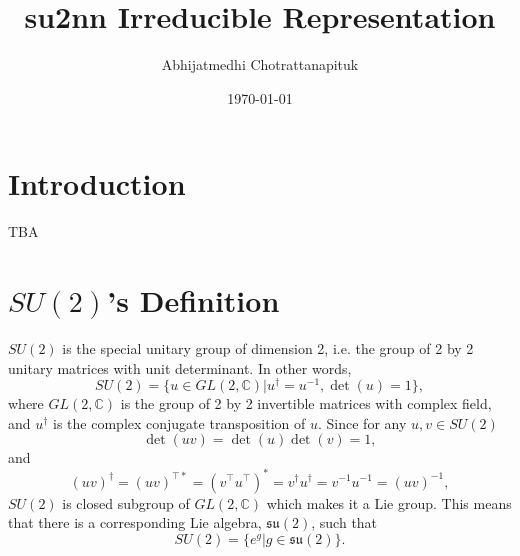 \documentclass[12pt]{revtex4-2}
\begin{document}
\title{su2nn Irreducible Representation}
\author{Abhijatmedhi Chotrattanapituk}

\date{\today}
\maketitle

\section{Introduction}
TBA

\section{$SU(2)$'s Definition}
$SU(2)$ is the special unitary group of dimension 2, i.e. the group of 2 by 2 unitary matrices 
with unit determinant. In other words,
\begin{equation}
    SU(2) = \{u \in GL(2, \mathbb{C})|u^\dagger=u^{-1}, \det(u) = 1\},
\end{equation}    
where $GL(2,\mathbb{C})$ is the group of 2 by 2 invertible matrices with complex field, and $u^\dagger$
is the complex conjugate transposition of $u$. Since for any $u, v \in SU(2)$
\begin{equation}
    \det(uv) = \det(u)\det(v) = 1,
\end{equation}
and
\begin{equation}
    (uv)^\dagger = (uv)^{\top\ast} = (v^\top u^\top)^\ast = v^\dagger u^\dagger = v^{-1}u^{-1} = (uv)^{-1},
\end{equation}
$SU(2)$ is closed subgroup of $GL(2, \mathbb{C})$ which makes it a Lie group. This means that
there is a corresponding Lie algebra, $\mathfrak{su(2)}$, such that 
\begin{equation}
    SU(2) = \{e^g|g \in \mathfrak{su(2)}\}.
\end{equation}
\end{document}
